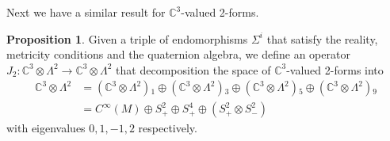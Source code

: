 \documentclass[10pt]{report}
\theoremstyle{definition}
\newtheorem{proposition}{Proposition}[chapter]
\newcommand{\C}[0]{\mathbb{C}}
\newcommand{\E}[0]{\C^3}
\begin{document}
Next we have a similar result for $\E$-valued 2-forms.
\begin{proposition}
    Given a triple of endomorphisms $\Sigma^i$ that satisfy the reality, metricity conditions and the quaternion algebra, we define an operator $J_2 : \E \otimes \Lambda^2 \rightarrow \E \otimes \Lambda^2$ that decomposition the space of $\E$-valued 2-forms into 
    \begin{align}
        \E \otimes \Lambda^2 & = (\E \otimes \Lambda^2){}_1 \oplus (\E \otimes \Lambda^2){}_3 \oplus (\E \otimes \Lambda^2){}_5 \oplus (\E \otimes \Lambda^2){}_9 \label{eq:pleb-E-valued-2-form-space-decomp} \\
        & = C^\infty (M) \oplus S_+^2 \oplus S_+^4 \oplus (S_+^2 \otimes S_-^2)
    \end{align}
    with eigenvalues $0,1,-1,2$ respectively.
\end{proposition}
\end{document}

